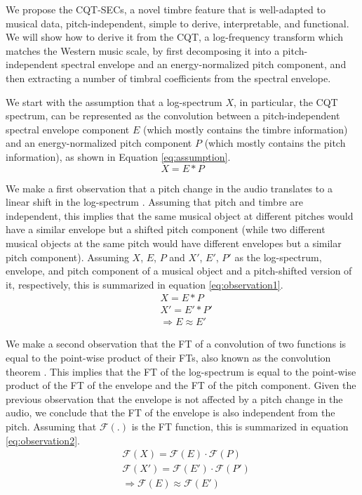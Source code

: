 \documentclass[journal]{IEEEtran}
\begin{document}
We propose the CQT-SECs, a novel timbre feature that is well-adapted to musical data, pitch-independent, simple to derive, interpretable, and functional. We will show how to derive it from the CQT, a log-frequency transform which matches the Western music scale, by first decomposing it into a pitch-independent spectral envelope and an energy-normalized pitch component, and then extracting a number of timbral coefficients from the spectral envelope. 

We start with the assumption that a log-spectrum $X$, in particular, the CQT spectrum, can be represented as the convolution between a pitch-independent spectral envelope component $E$ (which mostly contains the timbre information) and an energy-normalized pitch component $P$ (which mostly contains the pitch information), as shown in Equation \ref{eq:assumption}.
\begin{equation}
\label{eq:assumption}
X = E * P
\end{equation}

We make a first observation that a pitch change in the audio translates to a linear shift in the log-spectrum \cite{brown1991, brown1992}. Assuming that pitch and timbre are independent, this implies that the same musical object at different pitches would have a similar envelope but a shifted pitch component (while two different musical objects at the same pitch would have different envelopes but a similar pitch component). Assuming $X$, $E$, $P$ and $X'$, $E'$, $P'$ as the log-spectrum, envelope, and pitch component of a musical object and a pitch-shifted version of it, respectively, this is summarized in equation \ref{eq:observation1}.
\begin{equation}
\label{eq:observation1}
\begin{split}
&X = E * P \\
&X' = E' * P' \\
&\Rightarrow E \approx E'
\end{split}
\end{equation}

We make a second observation that the FT of a convolution of two functions is equal to the point-wise product of their FTs, also known as the convolution theorem \cite{proakis1995}. This implies that the FT of the log-spectrum is equal to the point-wise product of the FT of the envelope and the FT of the pitch component. Given the previous observation that the envelope is not affected by a pitch change in the audio, we conclude that the FT of the envelope is also independent from the pitch. Assuming that $\mathcal{F}(.)$ is the FT function, this is summarized in equation \ref{eq:observation2}.
\begin{equation}
\label{eq:observation2}
\begin{split}
&\mathcal{F}(X) = \mathcal{F}(E) \cdot \mathcal{F}(P) \\
&\mathcal{F}(X') = \mathcal{F}(E') \cdot \mathcal{F}(P') \\
&\Rightarrow \mathcal{F}(E) \approx \mathcal{F}(E')
\end{split}
\end{equation}
\end{document}
